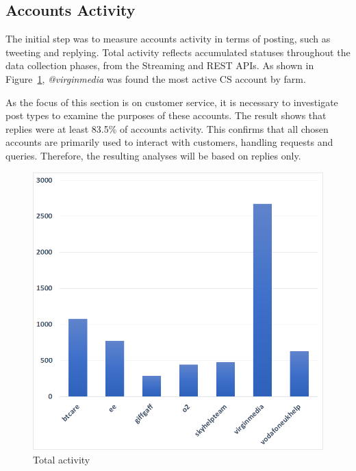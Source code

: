 \documentclass[sigconf]{acmart}
\begin{document}
\subsection{Accounts Activity}

The initial step was to measure accounts activity in terms of
posting, such as tweeting and replying. Total activity reflects 
accumulated statuses throughout the data collection phases, from 
the Streaming and REST APIs. As shown in Figure~\ref{fig:totalactivity}, 
{\emph{@virginmedia}} was found the most active CS account by 
farm. 

As the focus of this section is on customer service, it is 
necessary to investigate post types to examine the purposes of 
these accounts. The result shows that replies were at least 83.5\% 
of accounts activity. This confirms that all chosen accounts are 
primarily used to interact with customers, handling requests and 
queries. Therefore, the resulting analyses will be based on replies only.

\begin{figure}[htb]
\centering
\includegraphics[width=\columnwidth]{images/totalactivity.png}
\caption{Total activity}
\label{fig:totalactivity}
\end{figure}

\end{document}
